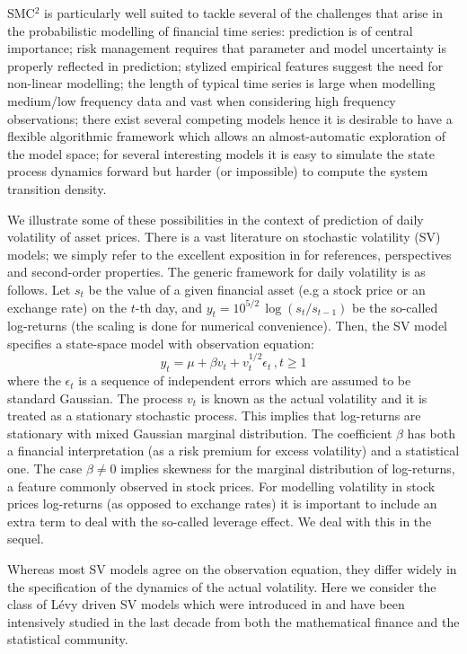 \documentclass{statsoc}
\newcommand{\SMCSQ}{SMC$^2$\xspace}
\begin{document}
\SMCSQ  is particularly well suited to tackle several of the
challenges that arise in the probabilistic modelling of financial time
series: prediction is of central importance; risk management requires
that parameter and model uncertainty is properly reflected in
prediction; stylized empirical features suggest the need for
non-linear modelling; the length of typical time series is large when
modelling 
medium/low frequency data and vast when considering 
high frequency observations; there exist several competing models hence
it is desirable to have a flexible algorithmic framework which allows
an almost-automatic exploration of the model space; for several
interesting models it is easy to simulate the state process dynamics forward but
harder (or impossible) to compute the system transition density. 

We illustrate some of these possibilities in the context of prediction
of daily volatility of asset prices. There is a vast literature on
stochastic volatility (SV) models; we simply refer to the excellent
exposition in  \cite{bns:real} for references, perspectives and
second-order properties. The generic framework for daily
volatility is as 
follows. Let $s_t$ be the value of a given
financial asset (e.g a stock price or an exchange rate) on the $t$-th
day, and $y_t=10^{5/2} \, \log(s_t/s_{t-1})$ be the so-called log-returns (the
scaling is done for numerical convenience). 
Then, the SV model specifies a state-space model
with observation  equation: 
\begin{equation}
  \label{eq:sv-obs}
  y_t = \mu + \beta v_t + v_t^{1/2} \epsilon_t \,, t\geq 1
\end{equation}
where the $\epsilon_t$ is a sequence of independent errors which are
assumed to be standard Gaussian. The process $v_t$ is known as the actual
volatility and  it is treated as a stationary stochastic
process. This implies that log-returns are stationary with mixed Gaussian
marginal distribution. The coefficient $\beta$ has both a financial
interpretation (as a risk premium for excess volatility) and a statistical one. The case $\beta \neq 0$
implies skewness for the marginal distribution of log-returns, a feature 
commonly observed in stock prices.  For modelling volatility in stock
prices log-returns (as opposed to exchange rates) it is important to include an extra term to deal with
the  so-called leverage effect. We deal with this in the sequel. 

Whereas most SV models agree on the observation
equation, they differ widely in the specification of the dynamics of
the actual volatility. Here we consider the class of L\'evy driven SV
models which were introduced in \cite{bns:ou} and have been
intensively studied in the last decade from both the mathematical
finance and the statistical community. 
\end{document}

